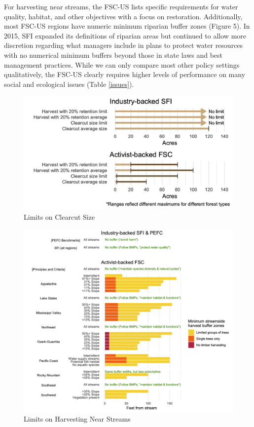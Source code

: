 \documentclass[
      12pt,
            Review ]{article}
\begin{document}
For harvesting near streams, the FSC-US lists specific requirements for
water quality, habitat, and other objectives with a focus on
restoration. Additionally, most FSC-US regions have numeric minimum
riparian buffer zones (Figure 5). In 2015, SFI expanded its definitions
of riparian areas but continued to allow more discretion regarding what
managers include in plans to protect water resources with no numerical
minimum buffers beyond those in state laws and best management
practices. While we can only compare most other policy settings
qualitatively, the FSC-US clearly requires higher levels of performance
on many social and ecological issues (Table \ref{issues}).

\begin{figure}
\centering
\includegraphics{clearcuts-1.png}
\caption{Limits on Clearcut Size\label{clearcuts}}
\end{figure}

\begin{figure}
\centering
\includegraphics{riparian-1.png}
\caption{Limits on Harvesting Near Streams\label{riparian}}
\end{figure}
\end{document}
